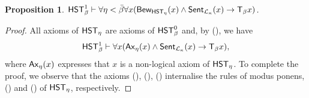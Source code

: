 \documentclass[UKenglish,cleveref,DIV=12]{scrartcl}
\newtheorem{proposition}[lemma]{Proposition}
\theoremstyle{definition}
\theoremstyle{definition}
\newtheorem{remark}{Remark}
\begin{document}
\begin{proposition}\label{global-reflect}
	\( \mathsf{HST}_\beta^1\vdash \forall \eta < \bar \beta \forall x( \mathsf{Bew}_{\mathsf{HST}_\eta}(x)\land\mathsf{Sent}_{\mathcal{L}_\kappa}(x)\rightarrow \mathsf{T}_\beta x) \).
\end{proposition}
\begin{proof}
	All axioms of $\mathsf{HST}_\eta$ are axioms of $\mathsf{HST}_\beta^0$ and, by (\Nec\beta), we have
	\begin{align*}
	  \mathsf{HST}_\beta^1\vdash \forall x( \mathsf{Ax}_{\eta}(x)\land\mathsf{Sent}_{\mathcal{L}_\kappa}(x)\rightarrow \mathsf{T}_\beta x ),
	\end{align*}
	where $\mathsf{Ax}_\eta(x)$ expresses that $x$ is a non-logical axiom of $\mathsf{HST}_\eta$.
	To complete the proof, we observe that the axioms
	(\Imp\beta), (\Del\beta), (\Rep\beta) 
	internalise the rules of {modus ponens}, (\Conec\eta) and (\Nec\eta) of $\mathsf{HST}_\eta$, respectively.
\end{proof}

\end{document}
